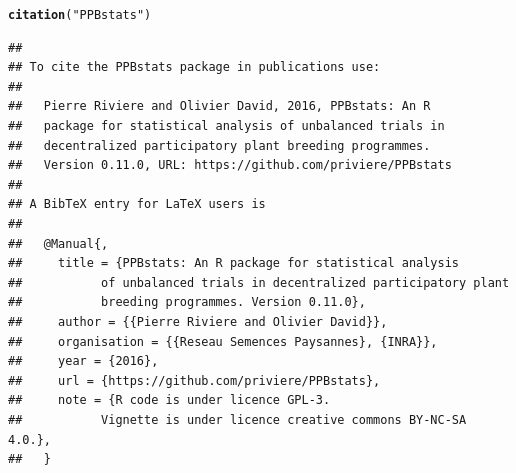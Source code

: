 \documentclass{article}\usepackage[]{graphicx}\usepackage[]{color}
\makeatletter
\newcommand{\hlstr}[1]{\textcolor[rgb]{0.192,0.494,0.8}{#1}}%
\newcommand{\hlstd}[1]{\textcolor[rgb]{0.345,0.345,0.345}{#1}}%
\newcommand{\hlkwd}[1]{\textcolor[rgb]{0.737,0.353,0.396}{\textbf{#1}}}%
\newenvironment{kframe}{%
 \def\at@end@of@kframe{}%
 \ifinner\ifhmode%
  \def\at@end@of@kframe{\end{minipage}}%
  \begin{minipage}{\columnwidth}%
 \fi\fi%
 \def\FrameCommand##1{\hskip\@totalleftmargin \hskip-\fboxsep
 \colorbox{shadecolor}{##1}\hskip-\fboxsep
     \hskip-\linewidth \hskip-\@totalleftmargin \hskip\columnwidth}%
 \MakeFramed {\advance\hsize-\width
   \@totalleftmargin\z@ \linewidth\hsize
   \@setminipage}}%
 {\par\unskip\endMakeFramed%
 \at@end@of@kframe}
\newenvironment{knitrout}{}{} %
\makeatother
\begin{document}
\begin{knitrout}
\color{fgcolor}\begin{kframe}
\begin{alltt}
\hlkwd{citation}\hlstd{(}\hlstr{"PPBstats"}\hlstd{)}
\end{alltt}
\begin{verbatim}
## 
## To cite the PPBstats package in publications use:
## 
##   Pierre Riviere and Olivier David, 2016, PPBstats: An R
##   package for statistical analysis of unbalanced trials in
##   decentralized participatory plant breeding programmes.
##   Version 0.11.0, URL: https://github.com/priviere/PPBstats
## 
## A BibTeX entry for LaTeX users is
## 
##   @Manual{,
##     title = {PPBstats: An R package for statistical analysis 
##           of unbalanced trials in decentralized participatory plant 
##           breeding programmes. Version 0.11.0},
##     author = {{Pierre Riviere and Olivier David}},
##     organisation = {{Reseau Semences Paysannes}, {INRA}},
##     year = {2016},
##     url = {https://github.com/priviere/PPBstats},
##     note = {R code is under licence GPL-3. 
##           Vignette is under licence creative commons BY-NC-SA 4.0.},
##   }
\end{verbatim}
\end{kframe}
\end{knitrout}



\end{document}
